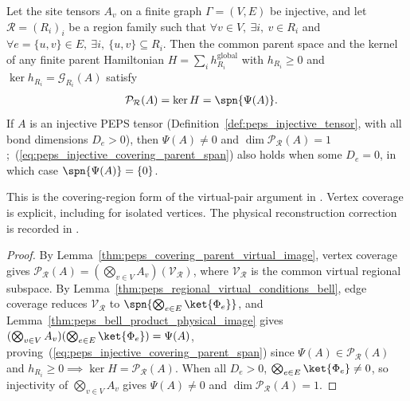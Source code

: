 \begin{theorem}%
    \label{thm:peps_injective_covering_parent_ground_space}
    \leanok
    Let the site tensors $A_v$ on a finite graph $\Gamma=(V,E)$ be injective,
    and let $\mathcal R=(R_i)_i$ be a region family such that
    $\forall v\in V,\ \exists i,\ v\in R_i$ and
    $\forall e=\{u,v\}\in E,\ \exists i,\ \{u,v\}\subseteq R_i$.
    Then the common parent space and the kernel of any finite parent
    Hamiltonian $H=\sum_i h_{R_i}^{\mathrm{global}}$ with $h_{R_i}\ge 0$ and
    $\ker h_{R_i}=\mathcal G_{R_i}(A)$ satisfy
    \begin{align}
        \mathcal P_{\mathcal R}(A) & = \ker H = \spn\{\Psi(A)\}.
        \label{eq:peps_injective_covering_parent_span}
    \end{align}
    If $A$ is an injective PEPS tensor (Definition~\ref{def:peps_injective_tensor},
    with all bond dimensions $D_e>0$), then $\Psi(A)\ne 0$ and
    $\dim\mathcal P_{\mathcal R}(A)=1$;~(\ref{eq:peps_injective_covering_parent_span})
    also holds when some $D_e=0$, in which case $\spn\{\Psi(A)\}=\{0\}$.

    This is the covering-region form of the virtual-pair argument in
    \cite[Section IV.C.1]{Cirac2021Matrix}. Vertex coverage is explicit,
    including for isolated vertices. The physical reconstruction
    correction is recorded in
    \cite{gap:cpgsv21_injective_parent_reconstruction}.
\end{theorem}

\begin{proof}\leanok
    By Lemma~\ref{thm:peps_covering_parent_virtual_image}, vertex coverage
    gives $\mathcal P_{\mathcal R}(A)=(\bigotimes_{v\in V}A_v)(\mathcal V_{\mathcal R})$,
    where $\mathcal V_{\mathcal R}$ is the common virtual regional subspace.
    By Lemma~\ref{thm:peps_regional_virtual_conditions_bell}, edge coverage
    reduces $\mathcal V_{\mathcal R}$ to $\spn\{\bigotimes_{e\in E}\ket{\Phi_e}\}$,
    and Lemma~\ref{thm:peps_bell_product_physical_image} gives
    $(\bigotimes_{v\in V}A_v)(\bigotimes_{e\in E}\ket{\Phi_e})=\Psi(A)$, proving~(\ref{eq:peps_injective_covering_parent_span})
    since $\Psi(A)\in\mathcal P_{\mathcal R}(A)$ and $h_{R_i}\ge 0\implies\ker H=\mathcal P_{\mathcal R}(A)$.
    When all $D_e>0$, $\bigotimes_{e\in E}\ket{\Phi_e}\ne 0$, so injectivity
    of $\bigotimes_{v\in V}A_v$ gives $\Psi(A)\ne 0$ and $\dim\mathcal P_{\mathcal R}(A)=1$.
\end{proof}
